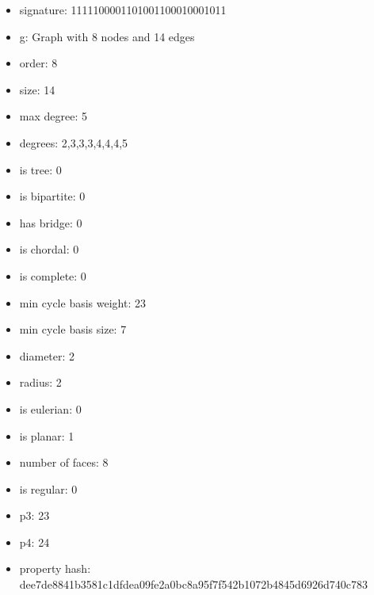 \begin{itemize}
\item signature: 1111100001101001100010001011
\item g: Graph with 8 nodes and 14 edges
\item order: 8
\item size: 14
\item max degree: 5
\item degrees: 2,3,3,3,4,4,4,5
\item is tree: 0
\item is bipartite: 0
\item has bridge: 0
\item is chordal: 0
\item is complete: 0
\item min cycle basis weight: 23
\item min cycle basis size: 7
\item diameter: 2
\item radius: 2
\item is eulerian: 0
\item is planar: 1
\item number of faces: 8
\item is regular: 0
\item p3: 23
\item p4: 24
\item property hash: dee7de8841b3581c1dfdea09fe2a0bc8a95f7f542b1072b4845d6926d740c783
\end{itemize}
\newpage
\begin{figure}
\end{figure}
